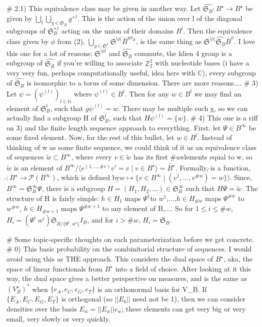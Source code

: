 # 2.1) This equivalence class may be given in another way. Let $\widehat{\mathfrak{S}_B}:B^\star\rightarrow B^\star$ be given by $\bigcup_l \bigcup_{g\in\mathfrak{S}_B}g^{\times l}$. This is the action of the union over l of the diagonal subgroups of  $\mathfrak{S}_B^{\times l}$ acting on the union of their domains $B^l$. Then the equivalence class given by $\phi$ from (2),  $\bigcup_{g\in\mathfrak{S}^4} \mathfrak{S}^{|\phi|} \bar{B}^{g \phi_{\bar{B}}}$, is the same thing as $\mathfrak{S}^{|\phi|}\widehat{\mathfrak{S}_B}\bar{B}^\phi$. I love this one for a lot of reasons: $\mathfrak{S}^{|\phi|}$ and $\widehat{\mathfrak{S}_B}$ commute, the klien 4 group is a subgroup of $ \widehat{\mathfrak{S}_B}$ if you're willing to associate $\mathbb{Z}_2^2$ with nucleotide bases (i have a very very fun, perhaps computationally useful, idea here with $\mathbb{C}$), every subgroup of $\widehat{\mathfrak{S}_B}$ is  isomorphic to a torus of some dimension. There are more reasons.... 
# 3) Let $\psi = (\psi^{(l)})_{l\in\mathbb{N}}$ where $\psi^{(l)} \in B^l$. Then for any $w \in B^l$ we may find an element of $\mathfrak{S}_B^l$, such that $g\psi^{(l)} = w$. There may be multiple such g, so we can actually find a subgroup H of $ \mathfrak{S}_B^l$, such that $H\psi^{(l)} = \{w\}$.
# 4) This one is a riff on 3) and the finite length sequence approach to everything. First, let $\Psi \in B^\infty$ be some fixed element. Now, for the rest of this bullet, let $w \in B^l$. Instead of thinking of w as some finite sequence, we could think of it as an equivalence class of sequences $\tilde{w} \subset B^\infty$, where every $v \in \tilde{w}$ has its first $\# w $elements equal to w, so $\tilde{w}$  is an element of $B^\infty / \langle e^{(1,\dots,\# v)} v' = v \mid v\in B^\star\rangle=\tilde{B^\star}$. Formally, $\tilde{} $is a function, $\tilde{}:B^\star\to\mathscr{P}(B^\infty)$, which is defined by$ w\mapsto\{v\in B^\infty\mid (v^1,\dots,v^{\# w}) = w \})$. Since, $B^\infty = \mathfrak{S}_B^\infty \Psi$, there is a subgroup $H = (H_1,H_2,\dots) \in \mathfrak{S}_B^\infty$ such that $H\Psi = \tilde{w}$. The structure of H is fairly simple: $h \in H_1$ maps $\Psi^1 $to $ w^1$,$\dots$,$h \in H_{\# w}$ maps $\Psi^{\# w}$ to $w^{\# w}$, $h\in H_{\# w + 1}$ maps $\Psi^{\# w +1}$ to any element of B,$\dots$. So for $1\le i\le\# w$, $H_i = (\Psi^i \: w^i)\mathfrak{S}_{ B / \{\Psi^i,w^i\}}I_B$, and for $i>\#w$, $H_i = \mathfrak{S}_B$.

# Some topic-specific thoughts on each parameterization before we get concrete.
# 0) This basic probability on the combinitorial structure of sequences. I would avoid using this as THE approach. This considers the dual space of $B^\star$, aka, the space of linear functionals from $B^\star$ into a field of choice. After looking at it this way, the dual space gives a better perspective on measures, and is the same as $(V_B^\star)^*$ when $ \{e_A,e_C,e_G,e_T\}$ is an orthonormal basis for V_B. If $\{E_A,E_C,E_G,E_T\}$ is orthogonal (so $||E_b||$ need not be 1), then we can consider densities over the basis $E_w = ||E_w|| e_w$; these elements can get very big or very small, very slowly or very quickly.


